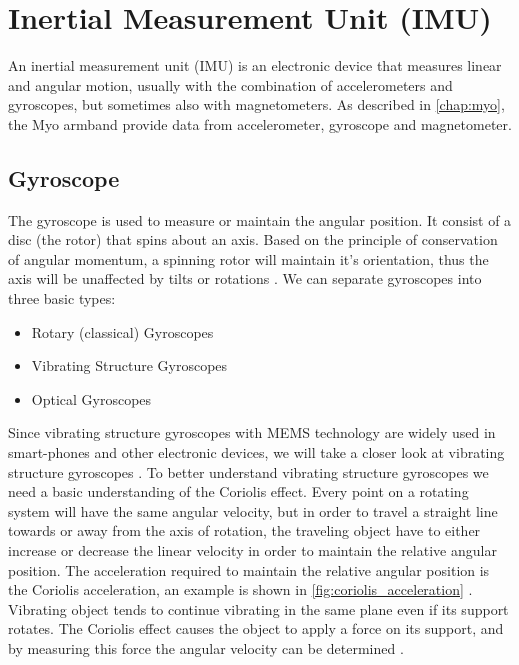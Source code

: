 \section{Inertial Measurement Unit (IMU)}
An inertial measurement unit (IMU) is an electronic device that measures linear and angular motion, usually with the combination of accelerometers and gyroscopes, but sometimes also with magnetometers. As described in \cref{chap:myo}, the Myo armband provide data from accelerometer, gyroscope and magnetometer.

\subsection{Gyroscope}
The gyroscope is used to measure or maintain the angular position. It consist of a disc (the rotor) that spins about an axis. Based on the principle of conservation of angular momentum, a spinning rotor will maintain it's orientation, thus the axis will be unaffected by tilts or rotations \cite{gyroscope_demonstration_project}. We can separate gyroscopes into three basic types:

\begin{itemize}
    \item Rotary (classical) Gyroscopes
    \item Vibrating Structure Gyroscopes
    \item Optical Gyroscopes
\end{itemize}

Since vibrating structure gyroscopes with MEMS technology are widely used in smart-phones and other electronic devices, we will take a closer look at vibrating structure gyroscopes \cite{vibrating_structure_gyroscope_wiki}. To better understand vibrating structure gyroscopes we need a basic understanding of the Coriolis effect. Every point on a rotating system will have the same angular velocity, but in order to travel a straight line towards or away from the axis of rotation, the traveling object have to either increase or decrease the linear velocity in order to maintain the relative angular position. The acceleration required to maintain the relative angular position is the Coriolis acceleration, an example is shown in \cref{fig:coriolis_acceleration} \cite{vibrating_structure_gyroscope}. Vibrating object tends to continue vibrating in the same plane even if its support rotates. The Coriolis effect causes the object to apply a force on its support, and by measuring this force the angular velocity can be determined \cite{vibrating_structure_gyroscope_wiki}.


